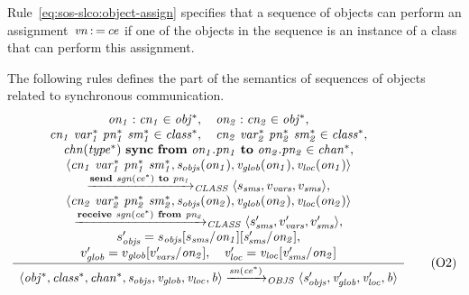 \noindent
Rule~\eqref{eq:sos-slco:object-assign} specifies that a sequence of objects can perform an assignment~$\it{vn} \operatorname*{:=} \it{ce}$ if one of the objects in the sequence is an instance of a class that can perform this assignment.

The following rules defines the part of the semantics of sequences of objects related to synchronous communication.
%
\begin{equation*}
 \frac{ \begin{array}[c]{c} 
\it{on_1}:\it{cn_1} \in \it{obj^*}, \quad
\it{on_2}:\it{cn_2} \in \it{obj^*}, \\
\it{cn_1}~\it{var^*_1}~\it{pn^*_1}~\it{sm^*_1} \in \it{class^*}, \quad
\it{cn_2}~\it{var^*_2}~\it{pn^*_2}~\it{sm^*_2} \in \it{class^*}, \\
\it{chn}(\it{type^*})~\textbf{sync}~\textbf{from}~\it{on_1}.\it{pn_1}~\textbf{to}~\it{on_2}.\it{pn_2} \in \it{chan^*}, \\
\langle \it{cn_1}~\it{var^*_1}~\it{pn^*_1}~\it{sm^*_1}, s_{\it{objs}}(\it{on_1}), v_{\it{glob}}(\it{on_1}), v_{\it{loc}}(\it{on_1}) \rangle \\
\xrightarrow{\it{\textbf{send}~\it{sgn}(\it{ce^*})~\textbf{to}~\it{pn_1}}}_{\it{CLASS}}
\langle s_{\it{sms}}, v_{\it{vars}}, v_{\it{sms}} \rangle, \\
\langle \it{cn_2}~\it{var^*_2}~\it{pn^*_2}~\it{sm^*_2}, s_{\it{objs}}(\it{on_2}), v_{\it{glob}}(\it{on_2}), v_{\it{loc}}(\it{on_2}) \rangle \\
\xrightarrow{\it{\textbf{receive}~\it{sgn}(\it{ce^*})~\textbf{from}~\it{pn_2}}}_{\it{CLASS}}
\langle s_{\it{sms}}', v_{\it{vars}}', v_{\it{sms}}' \rangle, \\
s_{\it{objs}}' = s_{\it{objs}}[s_{\it{sms}}/\it{on_1}][s_{\it{sms}}'/\it{on_2}], \\
v_{\it{glob}}' = v_{\it{glob}}[v_{\it{vars}}'/\it{on_2}], \quad
v_{\it{loc}}' = v_{\it{loc}}[v_{\it{sms}}'/\it{on_2}]
 \end{array} }{ \begin{array}[c]{c} 
\langle \it{obj^*}, \it{class^*}, \it{chan^*}, s_{\it{objs}}, v_{\it{glob}}, v_{\it{loc}}, b \rangle
\xrightarrow{\it{\it{sn}(\it{ce^*})}}_{\it{OBJS}}
\langle s_{\it{objs}}', v_{\it{glob}}', v_{\it{loc}}', b \rangle
 \end{array} } 
\tag{O2}
\label{eq:sos-slco:object-syncuni}
\end{equation*}
%
